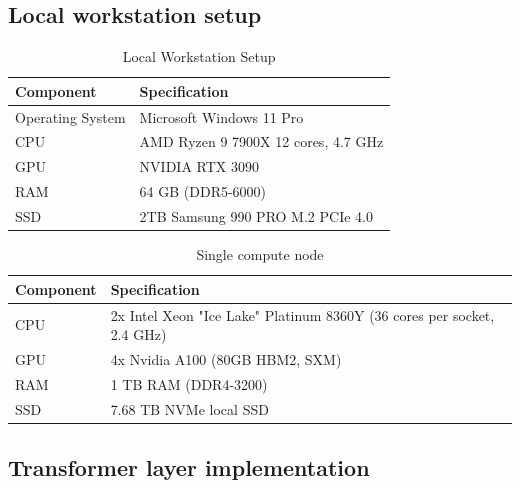 \newpage

\subsection{Local workstation setup}

\begin{table}[H]
    \centering
    \begin{tabularx}{0.90\textwidth}{|X|X|}
    \hline
    \textbf{Component} & \textbf{Specification} \\ \hline
    Operating System & Microsoft Windows 11 Pro \\ \hline
    CPU & AMD Ryzen 9 7900X 12 cores, 4.7 GHz \\ \hline
    GPU & NVIDIA RTX 3090 \\ \hline
    RAM & 64 GB (DDR5-6000) \\ \hline
    SSD & 2TB Samsung 990 PRO M.2 PCIe 4.0 \\ \hline
    \end{tabularx}
    \caption{Local Workstation Setup}
    \label{table:workstation_setup}
\end{table}
    
\begin{table}[H]
    \centering
    \begin{tabularx}{0.90\textwidth}{|X|X|}
    \hline
    \textbf{Component} & \textbf{Specification} \\ \hline
    CPU & 2x Intel Xeon "Ice Lake" Platinum 8360Y (36 cores per socket, 2.4 GHz) \\ \hline
    GPU & 4x Nvidia A100 (80GB HBM2, SXM) \\ \hline
    RAM & 1 TB RAM (DDR4-3200) \\ \hline
    SSD & 7.68 TB NVMe local SSD \\ \hline
    \end{tabularx}
    \caption{Single compute node}
    \label{table:server_setup}
\end{table}

\newpage

\subsection{Transformer layer implementation}
\label{sec:transformer_layer_Python}


